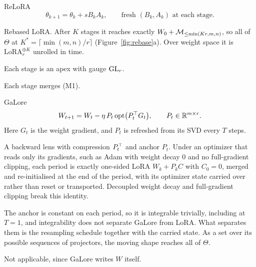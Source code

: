 \begin{example*}{ReLoRA}\label{ex:relora}%
\[
  \theta_{k+1}=\theta_k+sB_kA_k,\qquad \text{fresh }(B_k,A_k)\text{ at each stage}.
\]
\begin{exVIIlines}
\item[Base] Rebased LoRA. After $K$ stages it reaches exactly $W_0+\mathcal{M}_{\le\min(Kr,m,n)}$, so all of $\Theta$ at
  $K^*=\lceil\min(m,n)/r\rceil$ (Figure~\ref{fig:rebase}a). Over weight space it is $\mathrm{LoRA}_r^{\oplus K}$
  unrolled in time.
\item[Fibre] Each stage is an apex with gauge $\mathrm{GL}_r$.
\item[Merge] Each stage merges (M1).
\end{exVIIlines}
\end{example*}

\begin{example*}{GaLore}\label{ex:galore}%
\[
  W_{t+1}=W_t-\eta\,P_t\,\mathrm{opt}\big(P_t^{\top} G_t\big),\qquad P_t\in\mathbb{R}^{m\times r}.
\]
Here $G_t$ is the weight gradient, and $P_t$ is refreshed from its SVD every $T$ steps.
\begin{exVIIlines}
\item[Fibre] A backward lens with compression $P_t^{\top}$ and anchor $P_t$. Under an optimizer that reads only its
  gradients, such as Adam with weight decay $0$ and no full-gradient clipping, each period is exactly one-sided LoRA
  $W_k+P_kC$ with $C_0=0$, merged and re-initialised at the end of the period, with its optimizer state carried over
  rather than reset or transported. Decoupled weight decay and full-gradient clipping break this identity.
\item[Base] The anchor is constant on each period, so it is integrable trivially, including at $T=1$, and
  integrability does not separate GaLore from LoRA. What separates them is the resampling schedule together with the
  carried state. As a set over its possible sequences of projectors, the moving shape reaches all of $\Theta$.
\item[Merge] Not applicable, since GaLore writes $W$ itself.
\end{exVIIlines}
\end{example*}

